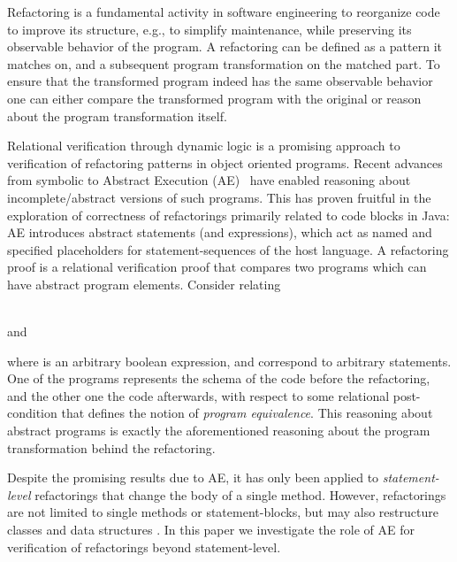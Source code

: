 Refactoring is a fundamental activity in software engineering to reorganize code to improve its structure, e.g., to simplify maintenance, while preserving its observable behavior of the program.
A refactoring can be defined as a pattern it matches on, and a subsequent program transformation on the matched part.
To ensure that the transformed program indeed has the same observable behavior one can either compare the transformed program with the 
original or %
reason about the program transformation itself.

Relational verification through dynamic logic is a promising approach to verification of refactoring patterns in object oriented programs.
Recent advances from symbolic to Abstract Execution (AE)~\cite{steinhoefel:ae} have enabled reasoning about incomplete/abstract versions of such programs.
This has proven fruitful in the exploration of correctness of refactorings primarily related to code blocks in Java:
%
AE introduces abstract statements (and expressions), which act as named and specified placeholders for statement-sequences of the host language.
A refactoring proof is a relational verification proof that compares two programs which can have abstract program elements.
Consider relating
\begin{center}
\\[0.3em]
and\\[0.3em]
\end{center}
where  is an arbitrary boolean expression,  and  correspond to arbitrary statements.
One of the programs represents the schema of the code before the refactoring, and the other one the code afterwards, with respect to some relational post-condition that defines the notion of \emph{program equivalence}. This reasoning about abstract programs is exactly the aforementioned reasoning about the program transformation behind the refactoring.

Despite the promising results due to AE, it has only been applied to \emph{statement-level} refactorings that
change the body of a single method.
However, refactorings are not limited to single methods or statement-blocks, but may also restructure classes and data structures \cite{fowler:refactoring}.
In this paper we investigate the role of AE for verification of refactorings beyond statement-level.


